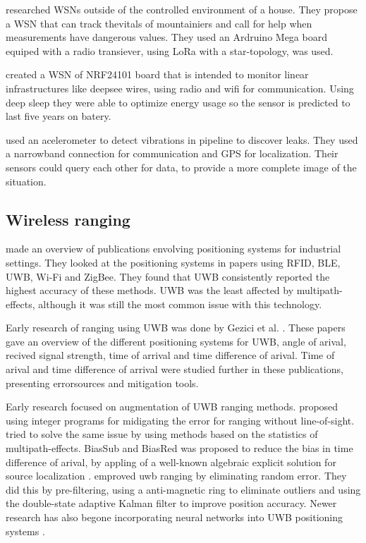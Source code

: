 \cite{garg2021healthcare} researched WSNs outside of the controlled environment of a house. They propose a WSN that can track thevitals of mountainiers and call for help when measurements have dangerous values. 
They used an Ardruino Mega board equiped with a radio transiever, using LoRa with a star-topology, was used.


\cite{jones2021wireless} created a WSN of NRF24101 board that is intended to monitor linear infrastructures like deepsee wires, using radio and wifi for communication. Using deep sleep they were able to optimize energy usage so the sensor is predicted to last five years on batery.


\cite{spandonidis2022evaluation} used an acelerometer to detect vibrations in pipeline to discover leaks. 
They used a narrowband connection for communication and GPS for localization.
Their sensors could query each other for data, to provide a more complete image of the situation.


\subsection{Wireless ranging}

\cite{li2024indoor} made an overview of publications envolving positioning systems for industrial settings. 
They looked at the positioning systems in papers using RFID, BLE, UWB, Wi-Fi and ZigBee. They found that UWB consistently reported the highest accuracy of these methods.
UWB was the least affected by multipath-effects, although it was still the most common issue with this technology.


Early research of ranging using UWB was done by Gezici et al. \cite{gezici2008survey, gezici2005localization}.
These papers gave an overview of the different positioning systems for UWB, angle of arival, recived signal strength, time of arrival and time difference of arival.
Time of arival and time difference of arrival were studied further in these publications, presenting errorsources and mitigation tools.


Early research focused on augmentation of UWB ranging methods.
\cite{venkatesh2007nlos} proposed using integer programs for midigating the error for ranging without line-of-sight.
\cite{guvencc2007nlos} tried to solve the same issue by using methods based on the statistics of multipath-effects.
BiasSub and BiasRed was proposed to reduce the bias in time difference of arival, by appling of a well-known algebraic explicit solution for source localization  \cite{ho2012bias}.
\cite{fan2017performance} emproved uwb ranging by eliminating random error. They did this by pre-filtering, using a anti-magnetic ring to eliminate outliers and using the double-state adaptive Kalman filter to improve position accuracy.
Newer research has also begone incorporating neural networks into UWB positioning systems \cite{stahlke2020nlos, ridolfi2021uwb, che2020machine}.

